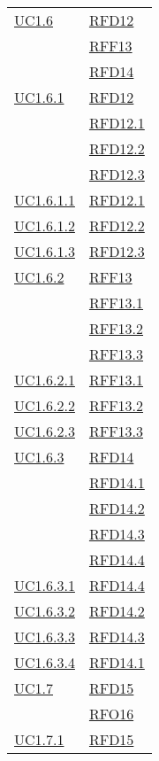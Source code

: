\begin{longtable}{|>{\centering}m{5cm}|m{5cm}<{\centering}|}
\hyperref[UC1.6]{UC1.6} & \hyperlink{RFD12}{RFD12}\\
& \hyperlink{RFF13}{RFF13}\\
& \hyperlink{RFD14}{RFD14}\\ \hline
\hyperref[UC1.6.1]{UC1.6.1} & \hyperlink{RFD12}{RFD12}\\
& \hyperlink{RFD12.1}{RFD12.1}\\
& \hyperlink{RFD12.2}{RFD12.2}\\
& \hyperlink{RFD12.3}{RFD12.3}\\ \hline
\hyperref[UC1.6.1.1]{UC1.6.1.1} & \hyperlink{RFD12.1}{RFD12.1}\\ \hline
\hyperref[UC1.6.1.2]{UC1.6.1.2} & \hyperlink{RFD12.2}{RFD12.2}\\ \hline
\hyperref[UC1.6.1.3]{UC1.6.1.3} & \hyperlink{RFD12.3}{RFD12.3}\\ \hline
\hyperref[UC1.6.2]{UC1.6.2} & \hyperlink{RFF13}{RFF13}\\
& \hyperlink{RFF13.1}{RFF13.1}\\
& \hyperlink{RFF13.2}{RFF13.2}\\
& \hyperlink{RFF13.3}{RFF13.3}\\ \hline
\hyperref[UC1.6.2.1]{UC1.6.2.1} & \hyperlink{RFF13.1}{RFF13.1}\\ \hline
\hyperref[UC1.6.2.2]{UC1.6.2.2} & \hyperlink{RFF13.2}{RFF13.2}\\ \hline
\hyperref[UC1.6.2.3]{UC1.6.2.3} & \hyperlink{RFF13.3}{RFF13.3}\\ \hline
\hyperref[UC1.6.3]{UC1.6.3} & \hyperlink{RFD14}{RFD14}\\
& \hyperlink{RFD14.1}{RFD14.1}\\
& \hyperlink{RFD14.2}{RFD14.2}\\
& \hyperlink{RFD14.3}{RFD14.3}\\
& \hyperlink{RFD14.4}{RFD14.4}\\ \hline
\hyperref[UC1.6.3.1]{UC1.6.3.1} & \hyperlink{RFD14.4}{RFD14.4}\\ \hline
\hyperref[UC1.6.3.2]{UC1.6.3.2} & \hyperlink{RFD14.2}{RFD14.2}\\ \hline
\hyperref[UC1.6.3.3]{UC1.6.3.3} & \hyperlink{RFD14.3}{RFD14.3}\\ \hline
\hyperref[UC1.6.3.4]{UC1.6.3.4} & \hyperlink{RFD14.1}{RFD14.1}\\ \hline
\hyperref[UC1.7]{UC1.7} & \hyperlink{RFD15}{RFD15}\\
& \hyperlink{RFO16}{RFO16}\\ \hline
\hyperref[UC1.7.1]{UC1.7.1} & \hyperlink{RFD15}{RFD15}\\

\end{longtable}
